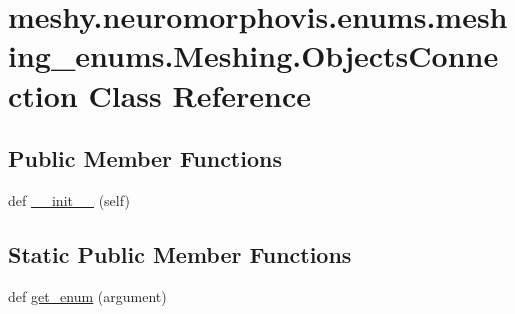\hypertarget{classmeshy_1_1neuromorphovis_1_1enums_1_1meshing__enums_1_1Meshing_1_1ObjectsConnection}{}\section{meshy.\+neuromorphovis.\+enums.\+meshing\+\_\+enums.\+Meshing.\+Objects\+Connection Class Reference}
\label{classmeshy_1_1neuromorphovis_1_1enums_1_1meshing__enums_1_1Meshing_1_1ObjectsConnection}


 


\subsection*{Public Member Functions}
\begin{DoxyCompactItemize}
\item 
def \hyperlink{classmeshy_1_1neuromorphovis_1_1enums_1_1meshing__enums_1_1Meshing_1_1ObjectsConnection_aa370b1843db19dddac5d92250adb138d}{\+\_\+\+\_\+init\+\_\+\+\_\+} (self)\hypertarget{classmeshy_1_1neuromorphovis_1_1enums_1_1meshing__enums_1_1Meshing_1_1ObjectsConnection_aa370b1843db19dddac5d92250adb138d}{}\label{classmeshy_1_1neuromorphovis_1_1enums_1_1meshing__enums_1_1Meshing_1_1ObjectsConnection_aa370b1843db19dddac5d92250adb138d}

\end{DoxyCompactItemize}
\subsection*{Static Public Member Functions}
\begin{DoxyCompactItemize}
\item 
def \hyperlink{classmeshy_1_1neuromorphovis_1_1enums_1_1meshing__enums_1_1Meshing_1_1ObjectsConnection_a12bc204fff71e7d8d38a7ad2dce257c5}{get\+\_\+enum} (argument)\hypertarget{classmeshy_1_1neuromorphovis_1_1enums_1_1meshing__enums_1_1Meshing_1_1ObjectsConnection_a12bc204fff71e7d8d38a7ad2dce257c5}{}\label{classmeshy_1_1neuromorphovis_1_1enums_1_1meshing__enums_1_1Meshing_1_1ObjectsConnection_a12bc204fff71e7d8d38a7ad2dce257c5}

\end{DoxyCompactItemize}
